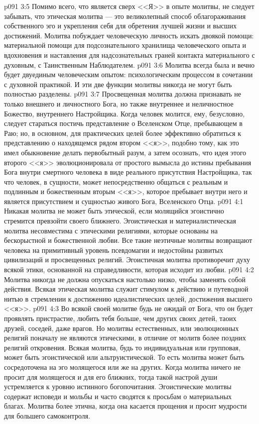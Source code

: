 \vs p091 3:5 Помимо всего, что является сверх <<Я>> в опыте молитвы, не следует забывать, что этическая молитва --- это великолепный способ облагораживания собственного эго и укрепления себя для обретения лучшей жизни и высших достижений. Молитва побуждает человеческую личность искать двоякой помощи: материальной помощи для подсознательного хранилища человеческого опыта и вдохновения и наставления для надсознательных граней контакта материального с духовным, с Таинственным Наблюдателем.
\vs p091 3:6 Молитва всегда была и вечно будет двуединым человеческим опытом: психологическим процессом в сочетании с духовной практикой. И эти две функции молитвы никогда не могут быть полностью разделены.
\vs p091 3:7 Просвещенная молитва должна признавать не только внешнего и личностного Бога, но также внутреннее и неличностное Божество, внутреннего Настройщика. Когда человек молится, ему, безусловно, следует стараться постичь представление о Вселенском Отце, пребывающем в Раю; но, в основном, для практических целей более эффективно обратиться к представлению о находящемся рядом втором <<я>>, подобно тому, как это имел обыкновение делать первобытный разум, а затем осознать, что идея этого второго <<я>> эволюционировала от простого вымысла до истины пребывания Бога внутри смертного человека в виде реального присутствия Настройщика, так что человек, в сущности, может непосредственно общаться с реальным и подлинным и божественным вторым <<я>>, которое пребывает внутри него и является присутствием и сущностью живого Бога, Вселенского Отца.
\vs p091 4:1 Никакая молитва не может быть этической, если молящийся эгоистично стремится превзойти своего ближнего. Эгоистическая и материалистическая молитва несовместима с этическими религиями, которые основаны на бескорыстной и божественной любви. Все такие неэтичные молитвы возвращают человека на примитивный уровень псевдомагии и недостойны развитых цивилизаций и просвещенных религий. Эгоистичная молитва противоречит духу всякой этики, основанной на справедливости, которая исходит из любви.
\vs p091 4:2 Молитва никогда не должна опускаться настолько низко, чтобы заменять собой действия. Всякая этическая молитва служит стимулом к действию и путеводной нитью в стремлении к достижению идеалистических целей, достижения высшего <<я>>.
\vs p091 4:3 Во всякой своей молитве будь  не ожидай от Бога, что он будет проявлять пристрастие, любить тебя больше, чем других своих детей, таоих друзей, соседей, даже врагов. Но молитвы естественных, или эволюционных религий поначалу не являются этическими, в отличие от молитв более поздних религий откровения. Всякая молитва, будь то индивидуальная или групповая, может быть эгоистической или альтруистической. То есть молитва может быть сосредоточена на эго молящегося или же на других. Когда молитва ничего не просит для молящегося и для его ближних, тогда такой настрой души устремляется к уровню истинного богопочитания. Эгоистические молитвы содержат исповеди и мольбы и часто сводятся к просьбам о материальных благах. Молитва более этична, когда она касается прощения и просит мудрости для большего самоконтроля.
